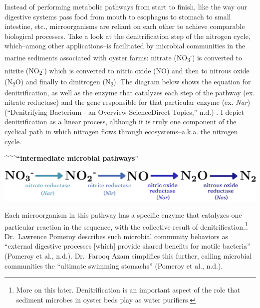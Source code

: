 \documentclass[
  11pt,
]{article}
\begin{document}
Instead of performing metabolic pathways from start to finish, like the
way our digestive systems pass food from mouth to esophagus to stomach
to small intestine, etc., microorganisms are reliant on each other to
achieve comparable biological processes. Take a look at the
denitrification step of the nitrogen cycle, which--among other
applications--is facilitated by microbial communities in the marine
sediments associated with oyster farms: nitrate
(NO\textsubscript{3}\textsuperscript{-}) is converted to nitrite
(NO\textsubscript{2}\textsuperscript{-}) which is converted to nitric
oxide (NO) and then to nitrous oxide (N\textsubscript{2}O) and finally
to dinitrogen (N\textsubscript{2}). The diagram below shows the equation
for denitrification, as well as the enzyme that catalyzes each step of
the pathway (ex. nitrate reductase) and the gene responsible for that
particular enzyme (ex. \emph{Nar}) ({``Denitrifying Bacterium - an
Overview \textbar{} ScienceDirect Topics,''} n.d.) . I depict
denitrification as a linear process, although it is truly one component
of the cyclical path in which nitrogen flows through ecosystems--a.k.a.
the nitrogen cycle.

\textbf{\^{}\^{}\^{}``intermediate microbial pathways}''

\includegraphics[width=6.5in,height=\textheight]{images/clipboard-3756250656.png}

Each microorganism in this pathway has a specific enzyme that catalyzes
one particular reaction in the sequence, with the collective result of
denitrification.\footnote{More on this later. Denitrification is an
  important aspect of the role that sediment microbes in oyster beds
  play as water purifiers.} Dr.~Lawrence Pomeroy describes such
microbial community behaviors as ``external digestive processes
{[}which{]} provide shared benefits for motile bacteria'' (Pomeroy et
al., n.d.). Dr.~Farooq Azam simplifies this further, calling microbial
communities the ``ultimate swimming stomachs'' (Pomeroy et al., n.d.).
\end{document}

